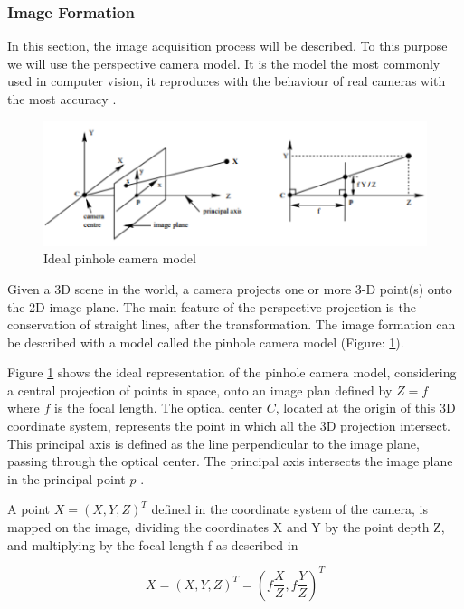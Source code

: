 \subsubsection{Image Formation}

In this section, the image acquisition process will be described. To this purpose we will use the perspective camera model. It is the model the most commonly used in computer vision, it reproduces with the behaviour of real cameras with the most accuracy \cite{Szeliski:2010:CVA:1941882}.

\begin{figure} [!ht]
    \centering
    \includegraphics[width=0.65\linewidth]{images/model.png}
    \caption{Ideal pinhole camera model}
    \label{pict:pinhole_camera_model}
\end{figure}

Given a 3D scene in the world, a camera projects one or more 3-D point(s) onto the 2D image plane. The main feature of the perspective projection is the conservation of straight lines, after the transformation. The image formation can be described with a model called the pinhole camera model \cite{Hartley2004} (Figure: \ref{pict:pinhole_camera_model}).

Figure \ref{pict:pinhole_camera_model} shows the ideal representation of the pinhole camera model, considering a central projection of points in space, onto an image plan defined by $Z = f$ where $f$ is the focal length. The optical center $C$, located at the origin of this 3D coordinate system, represents the point in which all the 3D projection intersect. This principal axis is defined as the line perpendicular to the image plane, passing through the optical center. The principal axis intersects the image plane in the principal point $p$ \cite{Hartley2004}.

A point $X = (X,Y,Z)^T$ defined in the coordinate system of the camera, is mapped on the image, dividing the coordinates X and Y by the point depth Z, and multiplying by the focal length f as described in

\begin{equation}
    X = (X,Y,Z)^T = (f \frac{X}{Z},f \frac{Y}{Z})^T
    \label{eq_image_1}
\end{equation}
\newpage

